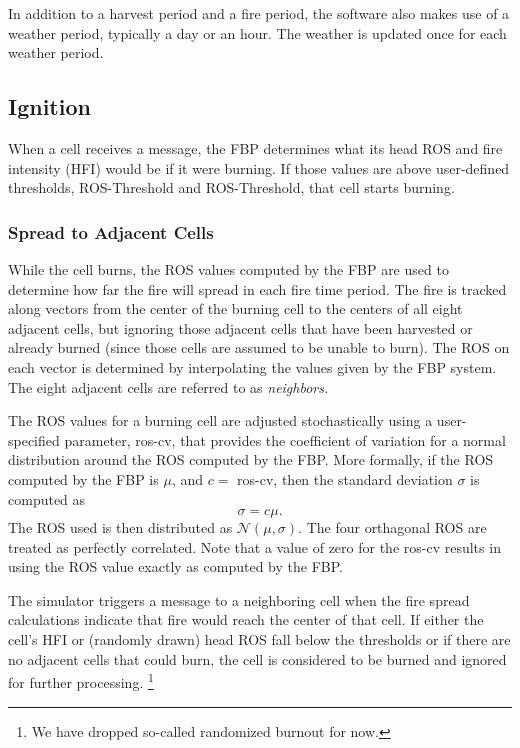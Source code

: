 \documentclass[11pt]{article}
\begin{document}
In addition to a harvest period and a fire period, the software also
makes use of a weather period, typically a day or an hour. The weather
is updated once for each weather period.

\subsection{Ignition}


When a cell receives a message, the FBP determines what its head ROS
and fire intensity (HFI) would be if it were burning. If those values are above user-defined
thresholds, {\sc ROS-Threshold} and {\sc ROS-Threshold}, that cell starts burning.

\subsubsection{Spread to Adjacent Cells}

 While
the cell burns, the ROS values computed by the FBP are used to
determine how far the fire will spread in each fire time period. The fire
is tracked along vectors from the center of the burning cell to the
centers of all eight adjacent cells, but ignoring those adjacent cells that
have been harvested or already burned (since those cells are
assumed to be unable to burn). The ROS on each vector is determined by
interpolating the values given by the FBP system. The eight
adjacent cells are referred to as {\em neighbors.}

The ROS values for a burning cell are
adjusted stochastically using a user-specified parameter, {\sc
  ros-cv}, that provides the coefficient of variation for a normal
distribution around the ROS computed by the FBP. More formally, if the
ROS computed by the FBP is $\mu$, and $c=$ {\sc ros-cv}, then the standard deviation $\sigma$
is computed as
$$
\sigma = c\mu.
$$
The ROS used is then
distributed as $\mathcal{N}(\mu, \sigma)$. The four orthagonal ROS
are treated as perfectly correlated. Note that
a value of zero for the {\sc ros-cv} results in using the ROS
value exactly as computed by the FBP.

The simulator triggers a message to a neighboring cell when
the fire spread calculations indicate that fire would
reach the center of that cell.
If either the cell's HFI or (randomly drawn) head ROS fall below the thresholds or
if there are no adjacent cells that could burn, the cell is considered
to be burned and ignored for further processing. \footnote{We have
  dropped so-called randomized burnout for now.}
\end{document}
